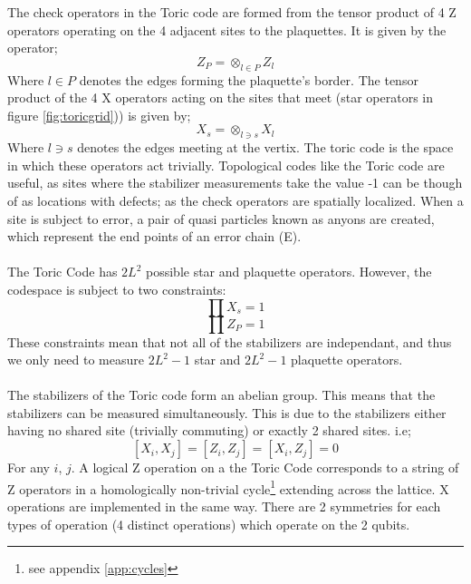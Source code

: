 The check operators in the Toric code are formed from the tensor product of 4 Z operators operating on the 4 adjacent sites to the plaquettes. It is given by the operator;
\begin{equation}
Z_P = \otimes_{l\in P}Z_l
\label{plaquetteoperator} 
\end{equation}
Where $l\in P$ denotes the edges forming the plaquette's border.
The tensor product of the 4 X operators acting on the sites that meet (star operators in figure \ref{fig:toricgrid})) is given by; 
\begin{equation}
X_s = \otimes_{l\ni s}X_l
\label{staroperator} 
\end{equation}
Where $l\ni s$ denotes the edges meeting at the vertix.
The toric code is the space in which these operators act trivially. 
Topological codes like the Toric code are useful, as sites where the stabilizer measurements take the value -1 can be though of as locations with defects; as the check operators are spatially localized. When a site is subject to error, a pair of quasi particles known as anyons are created, which represent the end points of an error chain (E). 
\\\\
The Toric Code has $2L^2$ possible star and plaquette operators. However, the codespace is subject to two constraints:
$$\prod X_s = 1 $$
$$\prod Z_P = 1 $$
These constraints mean that not all of the stabilizers are independant, and thus we only need to measure $2L^2-1$ star and $2L^2-1$ plaquette operators.
\\\\
The stabilizers of the Toric code form an abelian group. This means that the stabilizers can be measured simultaneously. This is due to the stabilizers either having no shared site (trivially commuting) or exactly 2 shared sites. i.e;
$$[X_i,X_j] = [Z_i,Z_j] = [X_i,Z_j] = 0$$
For any $i$, $j$.
A logical Z operation on a the Toric Code corresponds to a string of Z operators in a homologically non-trivial cycle\footnote{see appendix \ref{app:cycles}} extending across the lattice. X operations are implemented in the same way. There are 2 symmetries for each types of operation (4 distinct operations) which operate on the 2 qubits. 

